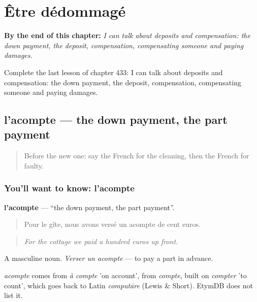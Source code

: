 
\chapter{Être dédommagé}
\label{ch:fr-etre-dedommage}

\begin{chapteropening}
\textbf{By the end of this chapter:} \emph{I can talk about deposits and compensation: the down payment, the deposit, compensation, compensating someone and paying damages.}

Complete the last lesson of chapter 433: I can talk about deposits and compensation: the down payment, the deposit, compensation, compensating someone and paying damages.
\end{chapteropening}

\section[l'acompte]{l'acompte — the down payment, the part payment}

\label{lesson:FR-C433-acompte}



\begin{quote}
Before the new one: say the French for the cleaning, then the French for faulty.
\end{quote}

\subsection*{You'll want to know: l'acompte}
\textbf{l'acompte} — \textquotedblleft{}the down payment, the part payment\textquotedblright{}.

\begin{quote}
Pour le gîte, nous avons versé un acompte de cent euros.
\end{quote}

\begin{quote}
\emph{For the cottage we paid a hundred euros up front.}
\end{quote}

A masculine noun. \emph{Verser un acompte} — to pay a part in advance.

\begin{cousinweb}
\emph{acompte} comes from \emph{à compte} 'on account', from \emph{compte}, built on \emph{compter} 'to count', which goes back to Latin \emph{computāre} (Lewis \& Short). EtymDB does not list it.
\end{cousinweb}

